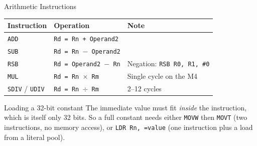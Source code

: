 \documentclass[9pt,aspectratio=169,xcolor=table]{beamer}
\begin{document}
\begin{frame}{Arithmetic Instructions}
    \begin{center}
    {\small
    \striped
    \begin{tabular}{@{}l l l@{}}
        \toprule
        \textbf{Instruction} & \textbf{Operation} & \textbf{Note} \\
        \midrule
        \texttt{ADD}  & \texttt{Rd = Rn + Operand2}   & \\
        \texttt{SUB}  & \texttt{Rd = Rn $-$ Operand2} & \\
        \texttt{RSB}  & \texttt{Rd = Operand2 $-$ Rn} & \alert{Negation}: \texttt{RSB R0, R1, \#0} \\
        \texttt{MUL}  & \texttt{Rd = Rn $\times$ Rm}  & Single cycle on the M4 \\
        \texttt{SDIV} / \texttt{UDIV} & \texttt{Rd = Rn $\div$ Rm} & 2--12 cycles \\
        \bottomrule
    \end{tabular}}
    \end{center}

    \vspace{3mm}
    \begin{block}{Loading a 32-bit constant}
        The immediate value must fit \emph{inside} the instruction,
        which is itself only 32 bits. So a full constant needs either
        \alert{\texttt{MOVW} then \texttt{MOVT}} (two instructions, no
        memory access), or \alert{\texttt{LDR Rn, =value}} (one
        instruction plus a load from a literal pool).
    \end{block}
\end{frame}
\end{document}
